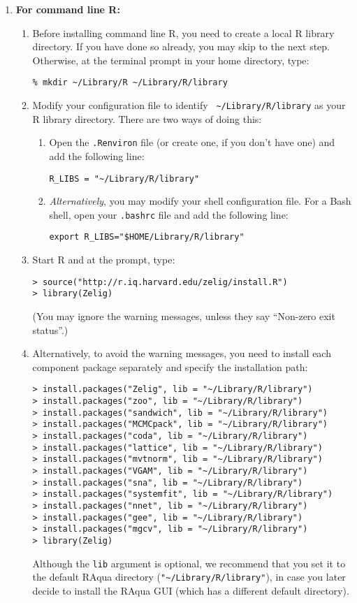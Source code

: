 \begin{enumerate}
\item {\bf For command line R:} 
  \begin{enumerate}
  \item Before installing command line R, you need to create a local R
    library directory.  If you have done so already, you may skip to
    the next step.  Otherwise, at the terminal prompt in your home
    directory, type:
\begin{verbatim}
% mkdir ~/Library/R ~/Library/R/library
\end{verbatim}
  \item Modify your configuration file to identify {\tt
      \~{}/Library/R/library} as your R library directory.  There are
    two ways of doing this:
    \begin{enumerate}
    \item Open the {\tt .Renviron} file (or create one, if you don't
      have one) and add the following line:
\begin{verbatim} 
R_LIBS = "~/Library/R/library"
\end{verbatim}
    \item {\it Alternatively}, you may modify your shell configuration
      file.  For a Bash shell, open your {\tt .bashrc} file and add
      the following line:
\begin{verbatim}
export R_LIBS="$HOME/Library/R/library"
\end{verbatim} %
      \end{enumerate}
    \item Start R and at the prompt, type:
\begin{verbatim}
> source("http://r.iq.harvard.edu/zelig/install.R")
> library(Zelig)
\end{verbatim}
(You may ignore the warning messages, unless they say ``Non-zero exit 
status''.)
\item Alternatively, to avoid the warning messages, you need to install 
each component package separately and specify the installation path:
\begin{verbatim}
> install.packages("Zelig", lib = "~/Library/R/library")
> install.packages("zoo", lib = "~/Library/R/library")
> install.packages("sandwich", lib = "~/Library/R/library")
> install.packages("MCMCpack", lib = "~/Library/R/library")
> install.packages("coda", lib = "~/Library/R/library")
> install.packages("lattice", lib = "~/Library/R/library")
> install.packages("mvtnorm", lib = "~/Library/R/library")
> install.packages("VGAM", lib = "~/Library/R/library")
> install.packages("sna", lib = "~/Library/R/library")
> install.packages("systemfit", lib = "~/Library/R/library")
> install.packages("nnet", lib = "~/Library/R/library")
> install.packages("gee", lib = "~/Library/R/library")
> install.packages("mgcv", lib = "~/Library/R/library")
> library(Zelig)
\end{verbatim}
      Although the {\tt lib} argument is optional, we recommend that
      you set it to the default RAqua directory
      (\verb|"~/Library/R/library"|), in case you later decide to
      install the RAqua GUI (which has a different default directory).
      \end{enumerate}
\end{enumerate}
  
